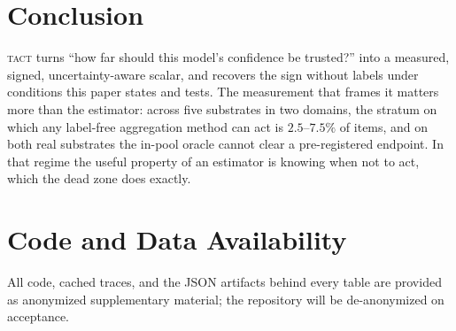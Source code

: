 \documentclass{article}
\newcommand{\TACT}{\textsc{tact}}
\begin{document}
\section{Conclusion}
\TACT{} turns ``how far should this model's confidence be trusted?'' into a
measured, signed, uncertainty-aware scalar, and recovers the sign without
labels under conditions this paper states and tests. The measurement that
frames it matters more than the estimator: across five substrates in two
domains, the stratum on which any label-free aggregation method can act is
$2.5$--$7.5\%$ of items, and on both real substrates the in-pool oracle cannot
clear a pre-registered endpoint. In that regime the useful property of an
estimator is knowing when not to act, which the dead zone does exactly.

\section*{Code and Data Availability}
All code, cached traces, and the JSON artifacts behind every table are
provided as anonymized supplementary material; the repository will be
de-anonymized on acceptance.



\end{document}
